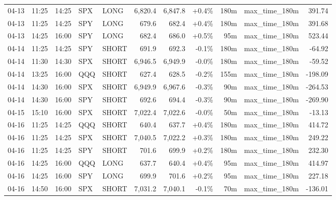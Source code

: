 \documentclass[11pt,a4paper,twoside]{article}
\begin{document}
\begin{center}
\begin{longtable}{>{\color{txtmain}}l l l l l r r r r >{\color{txtmain}}l r}
04-13 & 11:25 & 14:25 & SPX & LONG & 6,820.4 & 6,847.8 & \textcolor{wingreen}{+0.4\%} & 180m & max\_time\_180m & \textcolor{wingreen}{391.74} \\
04-13 & 11:25 & 14:25 & SPY & LONG & 679.6 & 682.4 & \textcolor{wingreen}{+0.4\%} & 180m & max\_time\_180m & \textcolor{wingreen}{391.68} \\
04-13 & 14:25 & 16:00 & SPY & LONG & 682.4 & 686.0 & \textcolor{wingreen}{+0.5\%} & 95m & max\_time\_180m & \textcolor{wingreen}{523.44} \\
04-14 & 11:25 & 14:25 & SPY & SHORT & 691.9 & 692.3 & \textcolor{lossred}{-0.1\%} & 180m & max\_time\_180m & \textcolor{lossred}{-64.92} \\
04-14 & 11:30 & 14:30 & SPX & SHORT & 6,946.5 & 6,949.9 & \textcolor{lossred}{-0.0\%} & 180m & max\_time\_180m & \textcolor{lossred}{-59.52} \\
04-14 & 13:25 & 16:00 & QQQ & SHORT & 627.4 & 628.5 & \textcolor{lossred}{-0.2\%} & 155m & max\_time\_180m & \textcolor{lossred}{-198.09} \\
04-14 & 14:30 & 16:00 & SPX & SHORT & 6,949.9 & 6,967.6 & \textcolor{lossred}{-0.3\%} & 90m & max\_time\_180m & \textcolor{lossred}{-264.53} \\
04-14 & 14:30 & 16:00 & SPY & SHORT & 692.6 & 694.4 & \textcolor{lossred}{-0.3\%} & 90m & max\_time\_180m & \textcolor{lossred}{-269.90} \\
04-15 & 15:10 & 16:00 & SPX & SHORT & 7,022.4 & 7,022.6 & \textcolor{lossred}{-0.0\%} & 50m & max\_time\_180m & \textcolor{lossred}{-13.13} \\
04-16 & 11:25 & 14:25 & QQQ & SHORT & 640.4 & 637.7 & \textcolor{wingreen}{+0.4\%} & 180m & max\_time\_180m & \textcolor{wingreen}{414.72} \\
04-16 & 11:25 & 14:25 & SPX & SHORT & 7,040.5 & 7,022.2 & \textcolor{wingreen}{+0.3\%} & 180m & max\_time\_180m & \textcolor{wingreen}{249.22} \\
04-16 & 11:25 & 14:25 & SPY & SHORT & 701.6 & 699.9 & \textcolor{wingreen}{+0.2\%} & 180m & max\_time\_180m & \textcolor{wingreen}{232.30} \\
04-16 & 14:25 & 16:00 & QQQ & LONG & 637.7 & 640.4 & \textcolor{wingreen}{+0.4\%} & 95m & max\_time\_180m & \textcolor{wingreen}{414.97} \\
04-16 & 14:25 & 16:00 & SPY & LONG & 699.9 & 701.6 & \textcolor{wingreen}{+0.2\%} & 95m & max\_time\_180m & \textcolor{wingreen}{227.18} \\
04-16 & 14:50 & 16:00 & SPX & SHORT & 7,031.2 & 7,040.1 & \textcolor{lossred}{-0.1\%} & 70m & max\_time\_180m & \textcolor{lossred}{-136.01} \\

\end{longtable}
\end{center}
\end{document}
